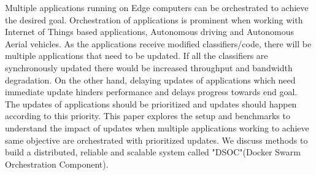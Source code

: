 Multiple applications running on Edge computers can be orchestrated to achieve the desired goal. Orchestration of  applications is prominent when working with Internet of Things based applications, Autonomous driving and Autonomous Aerial vehicles. As the applications receive modified classifiers/code, there will be multiple applications that need to be updated. If all the classifiers are synchronously updated there would be increased throughput and bandwidth degradation. On the other hand, delaying updates of applications which need immediate update hinders performance and delays progress towards end goal. The updates of applications should be prioritized and updates should happen according to this priority. This paper explores the setup and benchmarks to understand the impact of updates when multiple applications working to achieve same objective are orchestrated with prioritized updates. We discuss methods to build a distributed, reliable and scalable system called "DSOC"(Docker Swarm Orchestration Component).


